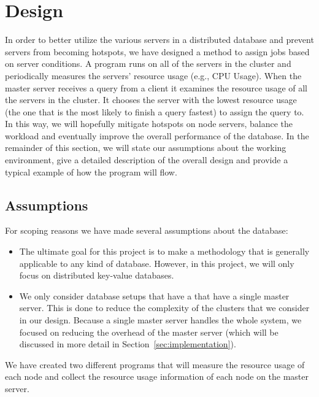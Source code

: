 \section{Design}
\label{sec:design}

In order to better utilize the various servers in a distributed database and prevent servers from becoming hotspots, we have designed a method to assign jobs based on server conditions. A program runs on all of the servers in the cluster and periodically measures the servers' resource usage (e.g., CPU Usage). When the master server receives a query from a client it examines the resource usage of all the servers in the cluster. It chooses the server with the lowest resource usage (the one that is the most likely to finish a query fastest) to assign the query to. In this way, we will hopefully mitigate hotspots on node servers, balance the workload and eventually improve the overall performance of the database. In the remainder of this section, we will state our assumptions about the working environment, give a detailed description of the overall design and provide a typical example of how the program will flow.

\subsection{Assumptions}
For scoping reasons we have made several assumptions about the database:

\begin{itemize}

\item The ultimate goal for this project is to make a methodology that is generally applicable to any kind of database. However, in this project, we will only focus on distributed key-value databases.

\item We only consider database setups that have a  that have a single master server. This is done to reduce the complexity of the clusters that we consider in our design. Because a single master server handles the whole system, we focused on reducing the overhead of the master server (which will be discussed in more detail in Section~\ref{sec:implementation}).

\end{itemize}

We have created two different programs that will measure the resource usage of each node and collect the resource usage information of each node on the master server.


